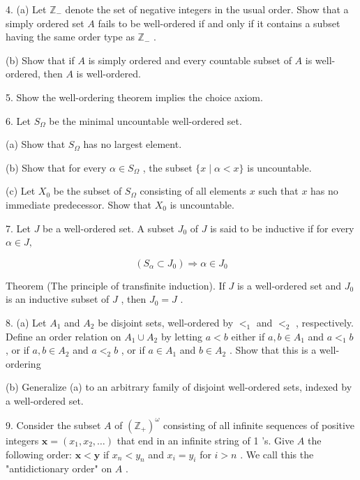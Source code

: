 4. (a) Let \({\mathbb{Z}}_{ - }\) denote the set of negative integers in the usual order. Show that a simply ordered set \(A\) fails to be well-ordered if and only if it contains a subset having the same order type as \({\mathbb{Z}}_{ - }\) .

(b) Show that if \(A\) is simply ordered and every countable subset of \(A\) is well-ordered, then \(A\) is well-ordered.

5. Show the well-ordering theorem implies the choice axiom.

6. Let \({S}_{\Omega }\) be the minimal uncountable well-ordered set.

(a) Show that \({S}_{\Omega }\) has no largest element.

(b) Show that for every \(\alpha  \in  {S}_{\Omega }\) , the subset \(\{ x \mid  \alpha  < x\}\) is uncountable.

(c) Let \({X}_{0}\) be the subset of \({S}_{\Omega }\) consisting of all elements \(x\) such that \(x\) has no immediate predecessor. Show that \({X}_{0}\) is uncountable.

7. Let \(J\) be a well-ordered set. A subset \({J}_{0}\) of \(J\) is said to be inductive if for every \(\alpha  \in  J,\)

\[
\left( {{S}_{\alpha } \subset  {J}_{0}}\right)  \Rightarrow  \alpha  \in  {J}_{0}
\]

Theorem (The principle of transfinite induction). If \(J\) is a well-ordered set and \({J}_{0}\) is an inductive subset of \(J\) , then \({J}_{0} = J\) .

8. (a) Let \({A}_{1}\) and \({A}_{2}\) be disjoint sets, well-ordered by \({ < }_{1}\) and \({ < }_{2}\) , respectively. Define an order relation on \({A}_{1} \cup  {A}_{2}\) by letting \(a < b\) either if \(a,b \in  {A}_{1}\) and \(a{ < }_{1}b\) , or if \(a,b \in  {A}_{2}\) and \(a{ < }_{2}b\) , or if \(a \in  {A}_{1}\) and \(b \in  {A}_{2}\) . Show that this is a well-ordering

(b) Generalize (a) to an arbitrary family of disjoint well-ordered sets, indexed by a well-ordered set.

9. Consider the subset \(A\) of \({\left( {\mathbb{Z}}_{ + }\right) }^{\omega }\) consisting of all infinite sequences of positive integers \(\mathbf{x} = \left( {{x}_{1},{x}_{2},\ldots }\right)\) that end in an infinite string of 1 ’s. Give \(A\) the following order: \(\mathbf{x} < \mathbf{y}\) if \({x}_{n} < {y}_{n}\) and \({x}_{i} = {y}_{i}\) for \(i > n\) . We call this the "antidictionary order" on \(A\) .

